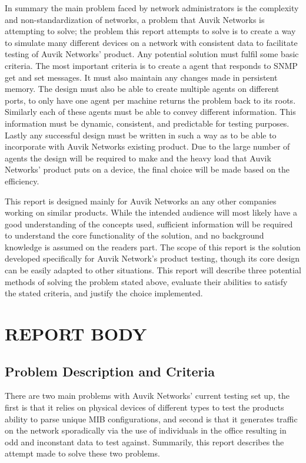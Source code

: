 \documentclass[12pt]{article}
\begin{document}
In summary the main problem faced by network administrators is the complexity and non-standardization of networks, a problem that Auvik Networks is attempting to solve; the problem this report attempts to solve is to create a way to simulate many different devices on a network with consistent data to facilitate testing of Auvik Networks' product. Any potential solution must fulfil some basic criteria. The most important criteria is to create a agent that responds to SNMP get and set messages. It must also maintain any changes made in persistent memory. The design must also be able to create multiple agents on different ports, to only have one agent per machine returns the problem back to its roots. Similarly each of these agents must be able to convey different information. This information must be dynamic, consistent, and predictable for testing purposes. Lastly any successful design must be written in such a way as to be able to incorporate with Auvik Networks existing product. Due to the large number of agents the design will be required to make and the heavy load that Auvik Networks' product puts on a device, the final choice will be made based on the efficiency.

This report is designed mainly for Auvik Networks an any other companies working on similar products. While the intended audience will most likely have a good understanding of the concepts used, sufficient information will be required to understand the core functionality of the solution, and no background knowledge is assumed on the readers part. The scope of this report is the solution developed specifically for Auvik Network's product testing, though its core design can be easily adapted to other situations. This report will describe three potential methods of solving the problem stated above, evaluate their abilities to satisfy the stated criteria, and justify the choice implemented.
\section{REPORT BODY}
\subsection{Problem Description and Criteria}
\indent\indent There are two main problems with Auvik Networks' current testing set up, the first is that it relies on physical devices of different types to test the products ability to parse unique MIB configurations, and second is that it generates traffic on the network sporadically via the use of individuals in the office resulting in odd and inconstant data to test against. Summarily, this report describes the attempt made to solve these two problems.
\end{document}
